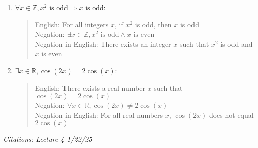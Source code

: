 \documentclass[11pt]{article}
\newcommand{\Z}{\mathbb{Z}}
\newcommand{\R}{\mathbb{R}}
\begin{document}
\begin{enumerate}
\begin{enumerate}
    \item $\forall x \in \Z, x^2 \textrm{ is odd} \Rightarrow x \textrm{ is odd}$:
    \begin{quote}
      English: For all integers $x$, if $x^2$ is odd, then $x$ is odd \\
      Negation: $\exists x \in \Z, x^2 \textrm{ is odd} \land x \textrm{ is even}$ \\
      Negation in English: There exists an integer $x$ such that $x^2$ is odd and $x$ is even
    \end{quote}

    \item $\exists x \in \R, \cos(2x) = 2 \cos(x)$:
    \begin{quote}
      English: There exists a real number $x$ such that $\cos(2x) = 2 \cos(x)$ \\
      Negation: $\forall x \in \R, \cos(2x) \neq 2 \cos(x)$ \\
      Negation in English: For all real numbers $x$, $\cos(2x)$ does not equal $2 \cos(x)$
    \end{quote}
  \end{enumerate}
  \textit{Citations: Lecture 4 1/22/25}
\end{enumerate}





\end{document}
